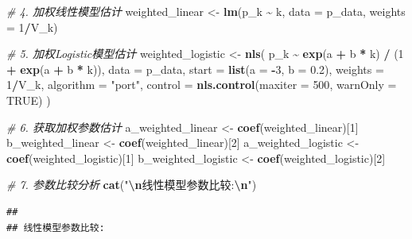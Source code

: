 \documentclass[
]{article}
\newenvironment{Shaded}{\begin{snugshade}}{\end{snugshade}}
\newcommand{\AttributeTok}[1]{\textcolor[rgb]{0.13,0.29,0.53}{#1}}
\newcommand{\CommentTok}[1]{\textcolor[rgb]{0.56,0.35,0.01}{\textit{#1}}}
\newcommand{\ConstantTok}[1]{\textcolor[rgb]{0.56,0.35,0.01}{#1}}
\newcommand{\DecValTok}[1]{\textcolor[rgb]{0.00,0.00,0.81}{#1}}
\newcommand{\FloatTok}[1]{\textcolor[rgb]{0.00,0.00,0.81}{#1}}
\newcommand{\FunctionTok}[1]{\textcolor[rgb]{0.13,0.29,0.53}{\textbf{#1}}}
\newcommand{\NormalTok}[1]{#1}
\newcommand{\OtherTok}[1]{\textcolor[rgb]{0.56,0.35,0.01}{#1}}
\newcommand{\SpecialCharTok}[1]{\textcolor[rgb]{0.81,0.36,0.00}{\textbf{#1}}}
\newcommand{\StringTok}[1]{\textcolor[rgb]{0.31,0.60,0.02}{#1}}
\begin{document}
\begin{Shaded}
\begin{Highlighting}[]
\CommentTok{\# 4. 加权线性模型估计}
\NormalTok{weighted\_linear }\OtherTok{\textless{}{-}} \FunctionTok{lm}\NormalTok{(p\_k }\SpecialCharTok{\textasciitilde{}}\NormalTok{ k, }\AttributeTok{data =}\NormalTok{ p\_data, }\AttributeTok{weights =} \DecValTok{1}\SpecialCharTok{/}\NormalTok{V\_k)}

\CommentTok{\# 5. 加权Logistic模型估计}
\NormalTok{weighted\_logistic }\OtherTok{\textless{}{-}} \FunctionTok{nls}\NormalTok{(}
\NormalTok{  p\_k }\SpecialCharTok{\textasciitilde{}} \FunctionTok{exp}\NormalTok{(a }\SpecialCharTok{+}\NormalTok{ b }\SpecialCharTok{*}\NormalTok{ k) }\SpecialCharTok{/}\NormalTok{ (}\DecValTok{1} \SpecialCharTok{+} \FunctionTok{exp}\NormalTok{(a }\SpecialCharTok{+}\NormalTok{ b }\SpecialCharTok{*}\NormalTok{ k)),}
  \AttributeTok{data =}\NormalTok{ p\_data,}
  \AttributeTok{start =} \FunctionTok{list}\NormalTok{(}\AttributeTok{a =} \SpecialCharTok{{-}}\DecValTok{3}\NormalTok{, }\AttributeTok{b =} \FloatTok{0.2}\NormalTok{),}
  \AttributeTok{weights =} \DecValTok{1}\SpecialCharTok{/}\NormalTok{V\_k,}
  \AttributeTok{algorithm =} \StringTok{"port"}\NormalTok{,}
  \AttributeTok{control =} \FunctionTok{nls.control}\NormalTok{(}\AttributeTok{maxiter =} \DecValTok{500}\NormalTok{, }\AttributeTok{warnOnly =} \ConstantTok{TRUE}\NormalTok{)}
\NormalTok{)}

\CommentTok{\# 6. 获取加权参数估计}
\NormalTok{a\_weighted\_linear }\OtherTok{\textless{}{-}} \FunctionTok{coef}\NormalTok{(weighted\_linear)[}\DecValTok{1}\NormalTok{]}
\NormalTok{b\_weighted\_linear }\OtherTok{\textless{}{-}} \FunctionTok{coef}\NormalTok{(weighted\_linear)[}\DecValTok{2}\NormalTok{]}
\NormalTok{a\_weighted\_logistic }\OtherTok{\textless{}{-}} \FunctionTok{coef}\NormalTok{(weighted\_logistic)[}\DecValTok{1}\NormalTok{]}
\NormalTok{b\_weighted\_logistic }\OtherTok{\textless{}{-}} \FunctionTok{coef}\NormalTok{(weighted\_logistic)[}\DecValTok{2}\NormalTok{]}

\CommentTok{\# 7. 参数比较分析}
\FunctionTok{cat}\NormalTok{(}\StringTok{"}\SpecialCharTok{\textbackslash{}n}\StringTok{线性模型参数比较:}\SpecialCharTok{\textbackslash{}n}\StringTok{"}\NormalTok{)}
\end{Highlighting}
\end{Shaded}

\begin{verbatim}
## 
## 线性模型参数比较:
\end{verbatim}
\end{document}
